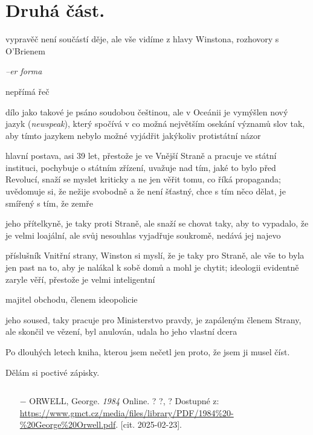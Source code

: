 \documentclass{article}
\begin{document}
\section{Druhá část.}
\begin{description}
    \setlength\itemsep{0.15em}
    \item[vypravěč:] vypravěč není součástí děje, ale vše vidíme z hlavy Winstona, rozhovory s O'Brienem
    \item[vyprávěcí způsoby:] \textit{--er forma}
    \item[typy promluv:] nepřímá řeč
    \item[jazyková stránka:] dílo jako takové je psáno soudobou češtinou, ale v Oceánii je vymýšlen nový jazyk (\textit{newspeak}),
        který spočívá v co možná největším osekání významů slov tak, aby tímto jazykem nebylo možné vyjádřit jakýkoliv protistátní názor
    \item[postavy:]
        \begin{description}
            \setlength\itemsep{0.15em}
           	\item[Winston,] hlavní postava, asi 39 let, přestože je ve Vnější Straně a pracuje ve státní instituci, pochybuje o
            státním zřízení, uvažuje nad tím, jaké to bylo před Revolucí, snaží se myslet kriticky a ne jen
            věřit tomu, co říká propaganda; uvědomuje si, že nežije svobodně a že není šťastný, chce s tím něco dělat,
            je smířený s tím, že zemře
           	\item[Julie,] jeho přítelkyně, je taky proti Straně, ale snaží se chovat taky, aby to vypadalo, že je velmi loajální,
                ale svůj nesouhlas vyjadřuje soukromě, nedává jej najevo
            \item[O`Brien,] příslušník Vnitřní strany, Winston si myslí, že je taky pro Straně, ale vše to byla jen past na to,
                aby je nalákal k sobě domů a mohl je chytit; ideologii evidentně zaryle věří, přestože je velmi inteligentní
            \item[Charrington,] majitel obchodu, členem ideopolicie
            \item[Parsons,] jeho soused, taky pracuje pro Ministerstvo pravdy, je zapáleným členem Strany, ale skončil ve vězení, byl anulován, udala ho jeho vlastní dcera
        \end{description}
    \item[názor:] Po dlouhých letech kniha, kterou jsem nečetl jen proto, že jsem ji musel číst.
    \item[kontext:]  Dělám si poctivé zápisky.
    \item[zdroje:] $ $
    \begin{itemize}
        \setlength\itemsep{0em}
        \item[$-$] ORWELL, George. \textit{1984} Online. ? ?, ? Dostupné z: \url{https://www.gmct.cz/media/files/library/PDF/1984%20-%20George%20Orwell.pdf}. [cit. 2025-02-23].
    \end{itemize}
\end{description}
\end{document}
